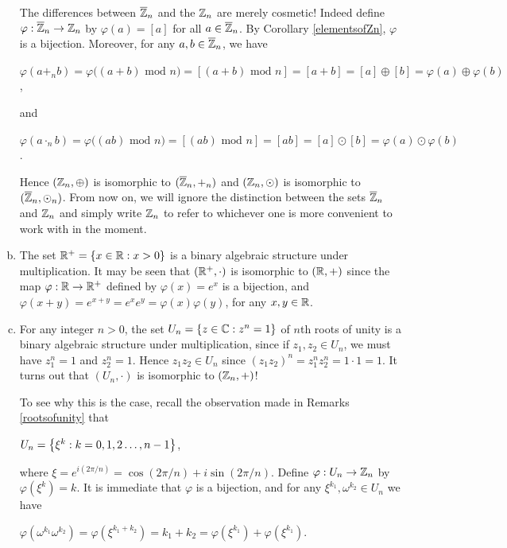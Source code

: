 \documentclass[11pt,fleqn,dvipsnames,usenames]{article}
\newcommand{\p}{\noindent}
\begin{document}
\begin{examples}
\begin{enumerate}[(a)]
\p The differences between $\overline{\mathbb{Z}}_{n}$ and the $\mathbb{Z}_{n}$ are merely cosmetic!  Indeed define $\varphi:\overline{\mathbb{Z}}_{n}\to \mathbb{Z}_{n}$ by $\varphi(a) = [a]$ for all $a \in \overline{\mathbb{Z}}_{n}$.  By Corollary \ref{elementsofZn}, $\varphi$ is a bijection.  Moreover, for any $a,b\in\overline{\mathbb{Z}}_{n}$, we have 
\begin{center}
$\varphi(a+_nb) = \varphi\big((a+b)\text{ mod }n\big) = [(a+b)\text{ mod }n] = [a+b] = [a]\oplus [b] = \varphi(a)\oplus\varphi(b)$,
\end{center}
and
\begin{center}
$\varphi(a\cdot_nb) = \varphi\big((ab)\text{ mod }n\big) = [(ab)\text{ mod }n] = [ab] = [a]\odot [b] = \varphi(a)\odot\varphi(b)$.
\end{center}
%
\p Hence $(\mathbb{Z}_{n},\oplus)$ is isomorphic to $(\overline{\mathbb{Z}}_n,+_n)$ and $(\mathbb{Z}_{n},\odot)$ is isomorphic to $(\overline{\mathbb{Z}}_n,\odot_n)$.  From now on, we will ignore the distinction between the sets $\overline{\mathbb{Z}}_n$ and $\mathbb{Z}_{n}$ and simply write $\mathbb{Z}_{n}$ to refer to whichever one is more convenient to work with in the moment.
%
\item The set $\mathbb{R}^{+} = \left\{x\in\mathbb{R}:x>0\right\}$ is a binary algebraic structure under multiplication.  It may be seen that $(\mathbb{R}^{+},\cdot)$ is isomorphic to $(\mathbb{R}, +)$ since the map $\varphi:\mathbb{R}\to\mathbb{R}^{+}$ defined by $\varphi(x) = e^{x}$ is a bijection, and $\varphi(x+y) = e^{x + y} = e^xe^{y} = \varphi(x)\varphi(y)$, for any $x,y\in\mathbb{R}$.
%
\item For any integer $n>0$, the set $U_{n} = \left\{z\in\mathbb{C}:z^n = 1\right\}$ of $n$th roots of unity is a binary algebraic structure under multiplication, since if $z_{1},z_{2}\in U_{n}$, we must have $z_{1}^n = 1$ and $z_{2}^n = 1$.  Hence $z_{1}z_{2}\in U_n$ since $(z_{1}z_{2})^n = z_{1}^nz_{2}^n = 1\cdot 1 = 1$.  It turns out that $(U_{n},\cdot)$ is isomorphic to $(\mathbb{Z}_{n},+)$!
\vsp

\p To see why this is the case, recall the observation made in Remarks \ref{rootsofunity} that
\begin{center}
$U_{n} = \left\{\xi^{k}:k=0,1,2\ldots, n-1\right\}$,
\end{center}
where $\xi = e^{i(2\pi/n)} = \cos(2\pi/n) + i\sin(2\pi/n)$.  Define $\varphi:U_{n}\to\mathbb{Z}_{n}$ by $\varphi(\xi^k) = k$.  It is immediate that $\varphi$ is a bijection, and for any $\xi^{k_1},\omega^{k_2}\in U_n$ we have
\begin{center}
$\varphi(\omega^{k_1}\omega^{k_2}) = \varphi(\xi^{k_1+k_2}) = k_1+k_2 = \varphi(\xi^{k_1}) + \varphi(\xi^{k_1})$.
\end{center}
\end{enumerate}
\end{examples}
\end{document}
